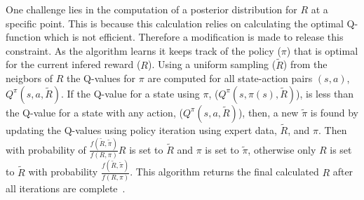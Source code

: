 \documentclass[12pt,american]{report}
\providecommand{\DIFaddtex}[1]{{\protect\color{blue}\uwave{#1}}} %
\providecommand{\DIFaddbegin}{} %
\providecommand{\DIFaddend}{} %
\providecommand{\DIFadd}[1]{\texorpdfstring{\DIFaddtex{#1}}{#1}} %
\newcommand{\DIFaddincludegraphics}[2][]{{\color{blue}\fbox{\DIFOincludegraphics[#1]{#2}}}} %
\DeclareRobustCommand{\DIFaddbegin}{\DIFOaddbegin \let\includegraphics\DIFaddincludegraphics} %
\DeclareRobustCommand{\DIFaddend}{\DIFOaddend \let\includegraphics\DIFOincludegraphics} %
\begin{document}
One challenge lies in the computation of a posterior distribution for $R$ at a specific point.  This is because this calculation relies on calculating the optimal Q-function which is not efficient.  Therefore a modification is made to release this constraint.  As the algorithm learns it keeps track of the policy ($\pi$) that is optimal for the current infered reward ($R$).  Using a uniform sampling ($\tilde{R}$) from the neigbors of $R$ the Q-values for $\pi$ are computed for all state-action pairs $(s,a)$, $Q^\pi(s,a,\tilde{R})$. If the Q-value for a state using $\pi$, ($Q^\pi(s,\pi(s),\tilde{R})$), is less than the Q-value for a state with any action, ($Q^\pi(s,a,\tilde{R})$), then, a new $\tilde{\pi}$ is found by updating the Q-values using policy iteration using expert data, $\tilde{R}$, and $\pi$. Then with probability of $\frac{f(\tilde{R},\tilde{\pi})}{f(R,\pi)}$\DIFaddbegin \DIFadd{, }\DIFaddend $R$ is set to $\tilde{R}$ and $\pi$ is set to $\tilde{\pi}$, otherwise only $R$ is set to $\tilde{R}$  with probability $\frac{f(\tilde{R},\tilde{\pi})}{f(R,\pi)}$.  This algorithm returns the final calculated $R$ after all iterations are complete~\cite{ramachandran2007bayesian}.
\end{document}
